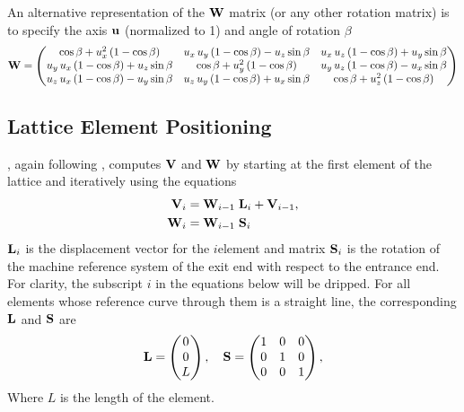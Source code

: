 An alternative representation of the ${\bf W}$ matrix (or any other rotation matrix) is to specify the
axis ${\bf u}$ (normalized to 1) and angle of rotation $\beta$
\begin{equation}
  {\bf W} = \begin{pmatrix}
    \cos \beta + u_x^2 \left(1 - \cos \beta \right) & 
    u_x \, u_y \left(1 - \cos \beta \right) - u_z \sin \beta & 
    u_x \, u_z \left(1 - \cos \beta \right) + u_y \sin \beta \\ 
    u_y \, u_x \left(1 - \cos \beta \right) + u_z \sin \beta & 
    \cos \beta + u_y^2\left(1 - \cos \beta \right) & 
    u_y \, u_z \left(1 - \cos \beta \right) - u_x \sin \beta \\ 
    u_z \, u_x \left(1 - \cos \beta \right) - u_y \sin \beta & 
    u_z \, u_y \left(1 - \cos \beta \right) + u_x \sin \beta & 
    \cos \beta + u_z^2\left(1 - \cos \beta \right)
  \end{pmatrix}
  \label{wctux2}
\end{equation}

\subsection{Lattice Element Positioning}
\label{s:ele.pos}

\accellat, again following \mad, computes ${\bf V}$ and ${\bf W}$ by starting at the first element of the
lattice and iteratively using the equations
\begin{align}
  {\bf V}_i &= {\bf W}_{i-1} \; {\bf L}_i + {\bf V}_{i-1}, 
    \label{vwlv} \\
  {\bf W}_i &= {\bf W}_{i-1} \; {\bf S}_i
    \label{wws}
\end{align}
${\bf L}_i$ is the displacement vector for the $i$\Th element and matrix ${\bf S}_i$ is the rotation of
the machine reference system of the exit end with respect to the entrance end. For clarity, the
subscript $i$ in the equations below will be dripped. For all elements whose reference curve through
them is a straight line, the corresponding ${\bf L}$ and ${\bf S}$ are
\begin{equation}
  {\bf L} = 
  \begin{pmatrix}
      0 \\ 0 \\ L
  \end{pmatrix},
  \quad
  {\bf S} = 
  \begin{pmatrix}
      1 & 0 & 0 \\ 
      0 & 1 & 0 \\
      0 & 0 & 1
  \end{pmatrix},
  \label{l00l}
\end{equation}
Where $L$ is the length of the element. 

